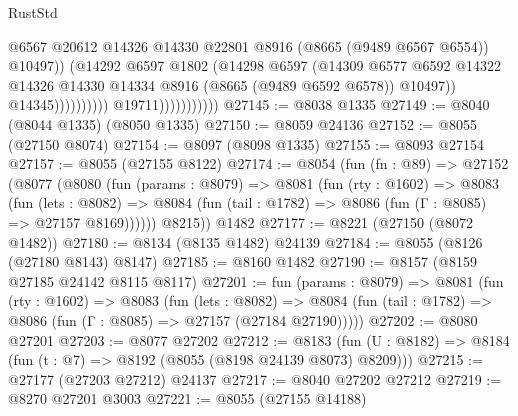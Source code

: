 \begin{lexlean}{RustStd}
\begin{coremodule}
                                                @6567
                                                @20612
                                                @14326
                                                @14330
                                                @22801
                                                @8916
                                                (@8665 (@9489 @6567 @6554))
                                                @10497))
                                            (@14292
                                              @6597
                                              @1802
                                              (@14298
                                                @6597
                                                (@14309
                                                  @6577
                                                  @6592
                                                  @14322
                                                  @14326
                                                  @14330
                                                  @14334
                                                  @8916
                                                  (@8665 (@9489 @6592 @6578))
                                                  @10497))
                                              @14345))))))))))
                          @19711)))))))))))
@27145 := @8038 @1335
@27149 := @8040 (@8044 @1335) (@8050 @1335)
@27150 := @8059 @24136
@27152 := @8055 (@27150 @8074)
@27154 := @8097 (@8098 @1335)
@27155 := @8093 @27154
@27157 := @8055 (@27155 @8122)
@27174 := @8054
    (fun (fn : @89) =>
    @27152
      (@8077
        (@8080
          (fun (params : @8079) =>
          @8081
            (fun (rty : @1602) =>
            @8083
              (fun (lets : @8082) =>
              @8084 (fun (tail : @1782) => @8086 (fun (Γ : @8085) => @27157 @8169))))))
        @8215))
    @1482
@27177 := @8221 (@27150 (@8072 @1482))
@27180 := @8134 (@8135 @1482) @24139
@27184 := @8055 (@8126 (@27180 @8143) @8147)
@27185 := @8160 @1482
@27190 := @8157 (@8159 @27185 @24142 @8115 @8117)
@27201 := fun (params : @8079) =>
  @8081
    (fun (rty : @1602) =>
    @8083
      (fun (lets : @8082) =>
      @8084 (fun (tail : @1782) => @8086 (fun (Γ : @8085) => @27157 (@27184 @27190)))))
@27202 := @8080 @27201
@27203 := @8077 @27202
@27212 := @8183
    (fun (U : @8182) => @8184 (fun (t : @7) => @8192 (@8055 (@8198 @24139 @8073) @8209)))
@27215 := @27177 (@27203 @27212) @24137
@27217 := @8040 @27202 @27212
@27219 := @8270 @27201 @3003
@27221 := @8055 (@27155 @14188)

\end{coremodule}
\end{lexlean}
